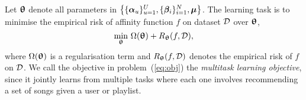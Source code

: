 





Let ${\bm{\uptheta}}$ denote all parameters in $\left\{ \{{\bm{\alpha}}_u\}_{u=1}^U, \{{\bm{\beta}}_i\}_{i=1}^N, \bm{\mu} \right\}$.
The learning task is to minimise the empirical risk of affinity function $f$ on dataset $\mathcal{D}$ over ${\bm{\uptheta}}$,
\ie %
\begin{equation}
\label{eq:obj}
\min_{\bm{\uptheta}} \, \Omega({\bm{\uptheta}}) + R_{\bm{\uptheta}}(f, \mathcal{D}),
\end{equation}
where $\Omega({\bm{\uptheta}})$ is a regularisation term and $R_{\bm{\uptheta}}(f, \mathcal{D})$ denotes the empirical risk
of $f$ on $\mathcal{D}$.
We call the objective in problem~(\ref{eq:obj}) the {\it multitask learning objective},
since it jointly learns from multiple tasks where each one involves recommending a set of songs 
given a user or playlist.


